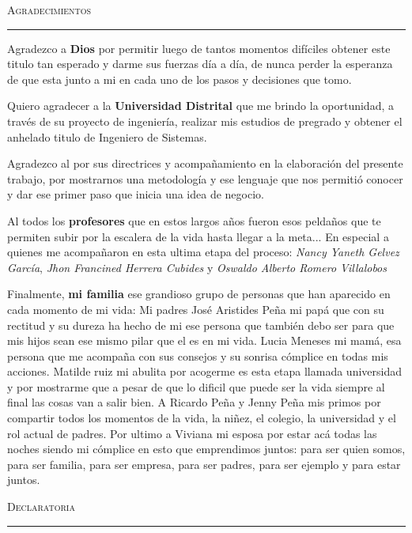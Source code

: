 \vspace*{3cm}
\noindent\Huge\textsc{Agradecimientos}\\
\normalsize
\noindent\rule[2pt]{\textwidth}{0.8pt}
\hspace*{3cm}

Agradezco a \textbf{Dios} por permitir luego de tantos momentos difíciles obtener este titulo tan esperado y darme sus fuerzas día a día, de nunca perder la esperanza de que esta junto a mi en cada uno de los pasos y decisiones que tomo.

Quiero agradecer a la \textbf{Universidad Distrital} que me brindo la oportunidad, a través de su proyecto de ingeniería, realizar mis estudios de pregrado y obtener el anhelado titulo de Ingeniero de Sistemas.

Agradezco al \textbf{\thesisFirstReviewer} por sus directrices y acompañamiento en la elaboración del presente trabajo, por mostrarnos una metodología y ese lenguaje que nos permitió conocer y dar ese primer paso que inicia una idea de negocio.

Al todos los \textbf{profesores} que en estos largos años fueron esos peldaños que te permiten subir por la escalera de la vida hasta llegar a la meta... En especial a quienes me acompañaron en esta ultima etapa del proceso: \textit{Nancy Yaneth Gelvez García}, \textit{Jhon Francined Herrera Cubides} y \textit{Oswaldo Alberto Romero Villalobos}

Finalmente, \textbf{mi familia} ese grandioso grupo de personas que han aparecido en cada momento de mi vida: Mi padres José Aristides Peña mi papá que con su rectitud y su dureza ha hecho de mi ese persona que también debo ser para que mis hijos sean ese mismo pilar que el es en mi vida. Lucia Meneses mi mamá, esa persona que me acompaña con sus consejos y su sonrisa cómplice en todas mis acciones. Matilde ruiz mi abulita por acogerme es esta etapa llamada universidad y por mostrarme que a pesar de que lo dificil que puede ser la vida siempre al final las cosas van a salir bien. A Ricardo Peña y Jenny Peña mis primos por compartir todos los momentos de la vida, la niñez, el colegio, la universidad y el rol actual de padres. Por ultimo a Viviana mi esposa por estar acá todas las noches siendo mi cómplice en esto que emprendimos juntos: para ser quien somos, para ser familia, para ser empresa, para ser padres, para ser ejemplo y para estar juntos.

\cleardoublepage
{}
\vspace*{3cm}
\noindent\Huge\textsc{Declaratoria}\\
\normalsize
\noindent\rule[2pt]{\textwidth}{0.8pt}
\hspace*{3cm}

